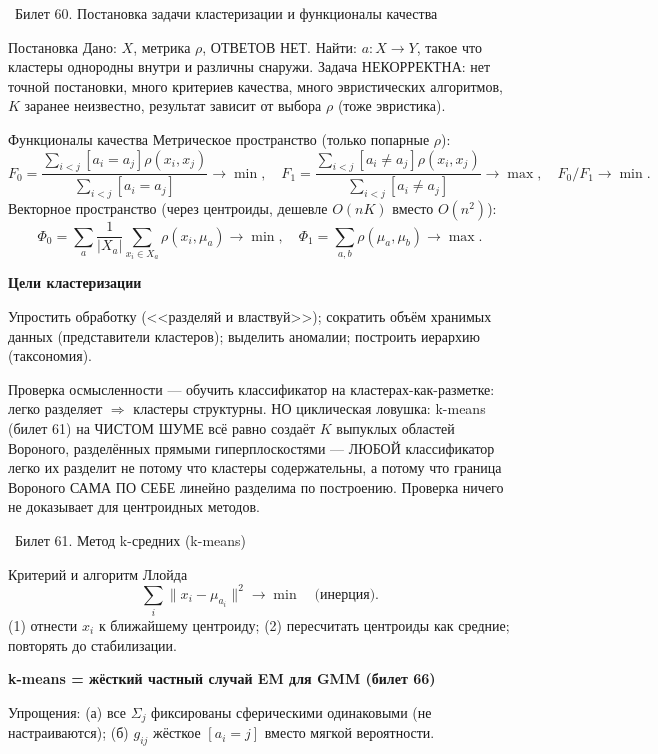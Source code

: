 \documentclass[12pt, a4paper]{article}
\newcommand{\bilet}[2]{%
  \vspace{10pt}%
  \noindent\colorbox{qcolor}{\parbox{\dimexpr\linewidth-2\fboxsep\relax}{%
    \color{white}\large\bfseries\strut\ Билет #1. #2%
  }}%
  \nopagebreak\vspace{5pt}\par\nopagebreak%
}
\newcommand{\qsub}[1]{%
  \vspace{5pt}%
  {\bfseries\color{defblue} #1}%
  \par\vspace{2pt}%
}
\begin{document}
\bilet{60}{Постановка задачи кластеризации и функционалы качества}

\begin{defbox}{Постановка}
Дано: $X$, метрика $\rho$, ОТВЕТОВ НЕТ. Найти: $a:X\to Y$, такое что кластеры однородны внутри и различны снаружи. Задача НЕКОРРЕКТНА: нет точной постановки, много критериев качества, много эвристических алгоритмов, $K$ заранее неизвестно, результат зависит от выбора $\rho$ (тоже эвристика).
\end{defbox}

\begin{defbox}{Функционалы качества}
Метрическое пространство (только попарные $\rho$):
\[
  F_0 = \frac{\sum_{i<j}[a_i{=}a_j]\rho(x_i,x_j)}{\sum_{i<j}[a_i{=}a_j]}\to\min, \quad F_1 = \frac{\sum_{i<j}[a_i{\ne}a_j]\rho(x_i,x_j)}{\sum_{i<j}[a_i{\ne}a_j]}\to\max, \quad F_0/F_1\to\min.
\]
Векторное пространство (через центроиды, дешевле $O(nK)$ вместо $O(n^2)$):
\[
  \Phi_0=\sum_a\frac{1}{|X_a|}\sum_{x_i\in X_a}\rho(x_i,\mu_a)\to\min, \quad \Phi_1=\sum_{a,b}\rho(\mu_a,\mu_b)\to\max.
\]
\end{defbox}

\qsub{Цели кластеризации}
Упростить обработку (<<разделяй и властвуй>>); сократить объём хранимых данных (представители кластеров); выделить аномалии; построить иерархию (таксономия).

\begin{fishkabox}
Проверка осмысленности --- обучить классификатор на кластерах-как-разметке: легко разделяет $\Rightarrow$ кластеры структурны. НО циклическая ловушка: k-means (билет 61) на ЧИСТОМ ШУМЕ всё равно создаёт $K$ выпуклых областей Вороного, разделённых прямыми гиперплоскостями --- ЛЮБОЙ классификатор легко их разделит не потому что кластеры содержательны, а потому что граница Вороного САМА ПО СЕБЕ линейно разделима по построению. Проверка ничего не доказывает для центроидных методов.
\end{fishkabox}

\bilet{61}{Метод k-средних (k-means)}

\begin{defbox}{Критерий и алгоритм Ллойда}
\[
  \sum_i \|x_i-\mu_{a_i}\|^2 \to\min \quad \text{(инерция)}.
\]
(1) отнести $x_i$ к ближайшему центроиду; (2) пересчитать центроиды как средние; повторять до стабилизации.
\end{defbox}

\qsub{k-means = жёсткий частный случай EM для GMM (билет 66)}
Упрощения: (а) все $\Sigma_j$ фиксированы сферическими одинаковыми (не настраиваются); (б) $g_{ij}$ жёсткое $[a_i{=}j]$ вместо мягкой вероятности.
\end{document}
